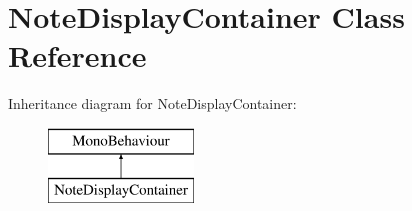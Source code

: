 \hypertarget{class_note_display_container}{}\section{Note\+Display\+Container Class Reference}
\label{class_note_display_container}
Inheritance diagram for Note\+Display\+Container\+:\begin{figure}[H]
\begin{center}
\leavevmode
\includegraphics[height=2.000000cm]{class_note_display_container}
\end{center}
\end{figure}
